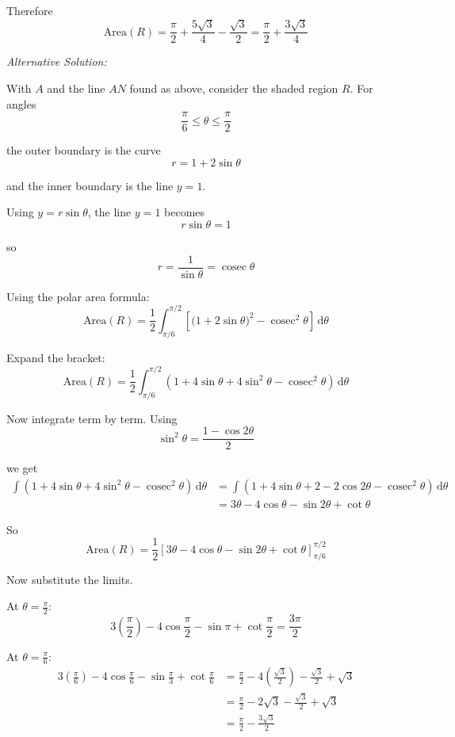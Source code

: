 \documentclass[leqno]{article}
\begin{document}
\begin{enumerate}[
	  label=\textbf{\arabic*.},
	  leftmargin=*,
	  topsep=0pt,
	  partopsep=0pt,
	  parsep=0pt
	]
\begin{djsSolution}
	Therefore
	\[
	\text{Area}(R)=\frac{\pi}{2}+\frac{5\sqrt3}{4}-\frac{\sqrt3}{2}=\frac{\pi}{2}+\frac{3\sqrt3}{4}
	\]

	\medskip

	\textit{Alternative Solution:}

	With $A$ and the line $AN$ found as above, consider the shaded region $R$. For angles
	\[
	\frac{\pi}{6}\leq \theta \leq \frac{\pi}{2}
	\]

	the outer boundary is the curve
	\[
	r=1+2\sin\theta
	\]

	and the inner boundary is the line $y=1$.
	
	Using $y=r\sin\theta$, the line $y=1$ becomes
	\[
	r\sin\theta=1
	\]

	so
	\[
	r=\frac{1}{\sin\theta}=\operatorname{cosec}\theta
	\]
	
	Using the polar area formula:
	\[
	\text{Area}(R)=\frac12\int_{\pi/6}^{\pi/2}\left[\bigl(1+2\sin\theta\bigr)^2-\operatorname{cosec}^2\theta\right]\,\mathrm{d}\theta
	\]

	Expand the bracket:
	\[
	\text{Area}(R)
	=\frac12\int_{\pi/6}^{\pi/2}\left(1+4\sin\theta+4\sin^2\theta-\operatorname{cosec}^2\theta\right)\,\mathrm{d}\theta
	\]
	
	Now integrate term by term. Using
	\[
	\sin^2\theta=\frac{1-\cos 2\theta}{2}
	\]

	we get
	\begin{align*}
	\int \left(1+4\sin\theta+4\sin^2\theta-\operatorname{cosec}^2\theta\right)\,\mathrm{d}\theta
	&=\int \left(1+4\sin\theta+2-2\cos2\theta-\operatorname{cosec}^2\theta\right)\,\mathrm{d}\theta\\
	&=3\theta-4\cos\theta-\sin2\theta+\cot\theta
	\end{align*}

	So
	\[
	\text{Area}(R)=\frac12\left[3\theta-4\cos\theta-\sin2\theta+\cot\theta\right]_{\pi/6}^{\pi/2}
	\]
	
	Now substitute the limits.
	
	At $\theta=\frac{\pi}{2}$:
	\[
	3\left(\frac{\pi}{2}\right)-4\cos\frac{\pi}{2}-\sin\pi+\cot\frac{\pi}{2}
	=\frac{3\pi}{2}
	\]
	
	At $\theta=\frac{\pi}{6}$:
	\begin{align*}
	3\left(\frac{\pi}{6}\right)-4\cos\frac{\pi}{6}-\sin\frac{\pi}{3}+\cot\frac{\pi}{6}
	&=\frac{\pi}{2}-4\left(\frac{\sqrt3}{2}\right)-\frac{\sqrt3}{2}+\sqrt3\\
	&=\frac{\pi}{2}-2\sqrt3-\frac{\sqrt3}{2}+\sqrt3\\
	&=\frac{\pi}{2}-\frac{3\sqrt3}{2}
	\end{align*}
	

\end{djsSolution}
\end{enumerate}
\end{document}

